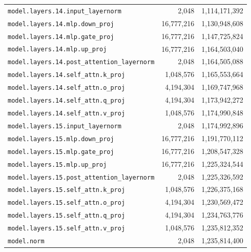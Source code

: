 \documentclass[10pt,a4paper]{article}
\begin{document}
\begin{appendices}
\begin{longtable}{p{9.5cm}rr}
\texttt{model.\allowbreak{}layers.\allowbreak{}14.\allowbreak{}input\_layernorm} & 2,048 & 1,114,171,392 \\
\texttt{model.\allowbreak{}layers.\allowbreak{}14.\allowbreak{}mlp.\allowbreak{}down\_proj} & 16,777,216 & 1,130,948,608 \\
\texttt{model.\allowbreak{}layers.\allowbreak{}14.\allowbreak{}mlp.\allowbreak{}gate\_proj} & 16,777,216 & 1,147,725,824 \\
\texttt{model.\allowbreak{}layers.\allowbreak{}14.\allowbreak{}mlp.\allowbreak{}up\_proj} & 16,777,216 & 1,164,503,040 \\
\texttt{model.\allowbreak{}layers.\allowbreak{}14.\allowbreak{}post\_attention\_layernorm} & 2,048 & 1,164,505,088 \\
\texttt{model.\allowbreak{}layers.\allowbreak{}14.\allowbreak{}self\_attn.\allowbreak{}k\_proj} & 1,048,576 & 1,165,553,664 \\
\texttt{model.\allowbreak{}layers.\allowbreak{}14.\allowbreak{}self\_attn.\allowbreak{}o\_proj} & 4,194,304 & 1,169,747,968 \\
\texttt{model.\allowbreak{}layers.\allowbreak{}14.\allowbreak{}self\_attn.\allowbreak{}q\_proj} & 4,194,304 & 1,173,942,272 \\
\texttt{model.\allowbreak{}layers.\allowbreak{}14.\allowbreak{}self\_attn.\allowbreak{}v\_proj} & 1,048,576 & 1,174,990,848 \\
\texttt{model.\allowbreak{}layers.\allowbreak{}15.\allowbreak{}input\_layernorm} & 2,048 & 1,174,992,896 \\
\texttt{model.\allowbreak{}layers.\allowbreak{}15.\allowbreak{}mlp.\allowbreak{}down\_proj} & 16,777,216 & 1,191,770,112 \\
\texttt{model.\allowbreak{}layers.\allowbreak{}15.\allowbreak{}mlp.\allowbreak{}gate\_proj} & 16,777,216 & 1,208,547,328 \\
\texttt{model.\allowbreak{}layers.\allowbreak{}15.\allowbreak{}mlp.\allowbreak{}up\_proj} & 16,777,216 & 1,225,324,544 \\
\texttt{model.\allowbreak{}layers.\allowbreak{}15.\allowbreak{}post\_attention\_layernorm} & 2,048 & 1,225,326,592 \\
\texttt{model.\allowbreak{}layers.\allowbreak{}15.\allowbreak{}self\_attn.\allowbreak{}k\_proj} & 1,048,576 & 1,226,375,168 \\
\texttt{model.\allowbreak{}layers.\allowbreak{}15.\allowbreak{}self\_attn.\allowbreak{}o\_proj} & 4,194,304 & 1,230,569,472 \\
\texttt{model.\allowbreak{}layers.\allowbreak{}15.\allowbreak{}self\_attn.\allowbreak{}q\_proj} & 4,194,304 & 1,234,763,776 \\
\texttt{model.\allowbreak{}layers.\allowbreak{}15.\allowbreak{}self\_attn.\allowbreak{}v\_proj} & 1,048,576 & 1,235,812,352 \\
\texttt{model.\allowbreak{}norm} & 2,048 & 1,235,814,400 \\
\end{longtable}
\end{appendices}
\end{document}
